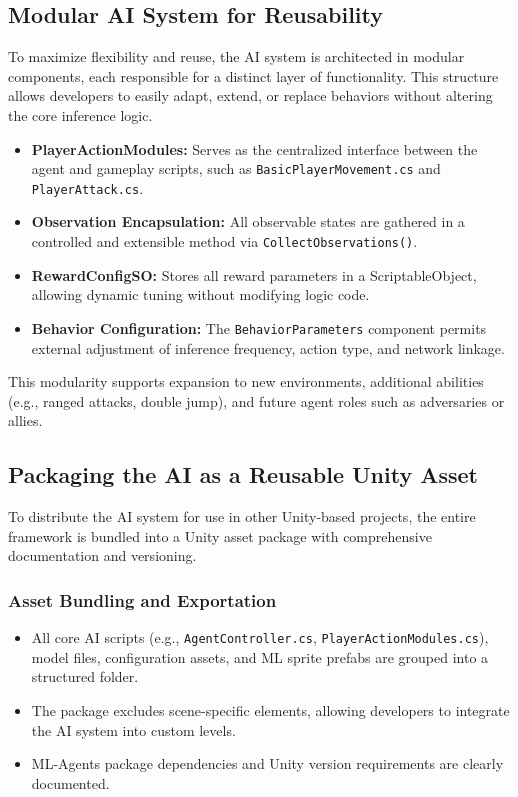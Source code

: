 \documentclass[12pt,oneside,openright,a4paper]{cpe-english-project}
\begin{document}
\subsection{Modular AI System for Reusability}
To maximize flexibility and reuse, the AI system is architected in modular components, each responsible for a distinct layer of functionality. This structure allows developers to easily adapt, extend, or replace behaviors without altering the core inference logic.
\begin{itemize}
\item \textbf{PlayerActionModules:} Serves as the centralized interface between the agent and gameplay scripts, such as \texttt{BasicPlayerMovement.cs} and \texttt{PlayerAttack.cs}.
\item \textbf{Observation Encapsulation:} All observable states are gathered in a controlled and extensible method via \texttt{CollectObservations()}.
\item \textbf{RewardConfigSO:} Stores all reward parameters in a ScriptableObject, allowing dynamic tuning without modifying logic code.
\item \textbf{Behavior Configuration:} The \texttt{BehaviorParameters} component permits external adjustment of inference frequency, action type, and network linkage.
\end{itemize}

This modularity supports expansion to new environments, additional abilities (e.g., ranged attacks, double jump), and future agent roles such as adversaries or allies.

\subsection{Packaging the AI as a Reusable Unity Asset}

To distribute the AI system for use in other Unity-based projects, the entire framework is bundled into a Unity asset package with comprehensive documentation and versioning.

\subsubsection{Asset Bundling and Exportation}

\begin{itemize}
\item All core AI scripts (e.g., \texttt{AgentController.cs}, \texttt{PlayerActionModules.cs}), model files, configuration assets, and ML sprite prefabs are grouped into a structured folder.
\item The package excludes scene-specific elements, allowing developers to integrate the AI system into custom levels.
\item ML-Agents package dependencies and Unity version requirements are clearly documented.
\end{itemize}
\end{document}
